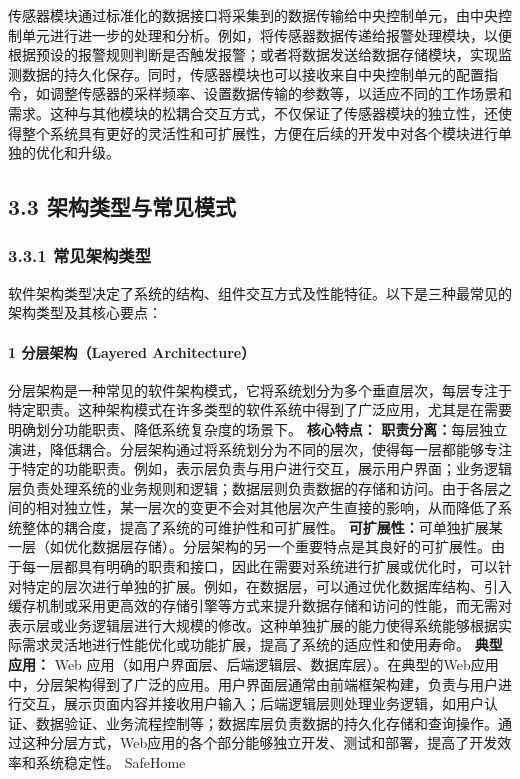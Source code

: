 传感器模块通过标准化的数据接口将采集到的数据传输给中央控制单元，由中央控制单元进行进一步的处理和分析。例如，将传感器数据传递给报警处理模块，以便根据预设的报警规则判断是否触发报警；或者将数据发送给数据存储模块，实现监测数据的持久化保存。同时，传感器模块也可以接收来自中央控制单元的配置指令，如调整传感器的采样频率、设置数据传输的参数等，以适应不同的工作场景和需求。这种与其他模块的松耦合交互方式，不仅保证了传感器模块的独立性，还使得整个系统具有更好的灵活性和可扩展性，方便在后续的开发中对各个模块进行单独的优化和升级。

\subsection{3.3 架构类型与常见模式}\label{ux67b6ux6784ux7c7bux578bux4e0eux5e38ux89c1ux6a21ux5f0f} \subsubsection{3.3.1 常见架构类型}\label{ux5e38ux89c1ux67b6ux6784ux7c7bux578b} 软件架构类型决定了系统的结构、组件交互方式及性能特征。以下是三种最常见的架构类型及其核心要点： \paragraph{1 分层架构（Layered Architecture）}\label{ux5206ux5c42ux67b6ux6784layered-architecture} 分层架构是一种常见的软件架构模式，它将系统划分为多个垂直层次，每层专注于特定职责。这种架构模式在许多类型的软件系统中得到了广泛应用，尤其是在需要明确划分功能职责、降低系统复杂度的场景下。 \textbf{核心特点：} \textbf{职责分离：}每层独立演进，降低耦合。分层架构通过将系统划分为不同的层次，使得每一层都能够专注于特定的功能职责。例如，表示层负责与用户进行交互，展示用户界面；业务逻辑层负责处理系统的业务规则和逻辑；数据层则负责数据的存储和访问。由于各层之间的相对独立性，某一层次的变更不会对其他层次产生直接的影响，从而降低了系统整体的耦合度，提高了系统的可维护性和可扩展性。 \textbf{可扩展性：}可单独扩展某一层（如优化数据层存储）。分层架构的另一个重要特点是其良好的可扩展性。由于每一层都具有明确的职责和接口，因此在需要对系统进行扩展或优化时，可以针对特定的层次进行单独的扩展。例如，在数据层，可以通过优化数据库结构、引入缓存机制或采用更高效的存储引擎等方式来提升数据存储和访问的性能，而无需对表示层或业务逻辑层进行大规模的修改。这种单独扩展的能力使得系统能够根据实际需求灵活地进行性能优化或功能扩展，提高了系统的适应性和使用寿命。 \textbf{典型应用：} Web 应用（如用户界面层、后端逻辑层、数据库层）。在典型的Web应用中，分层架构得到了广泛的应用。用户界面层通常由前端框架构建，负责与用户进行交互，展示页面内容并接收用户输入；后端逻辑层则处理业务逻辑，如用户认证、数据验证、业务流程控制等；数据库层负责数据的持久化存储和查询操作。通过这种分层方式，Web应用的各个部分能够独立开发、测试和部署，提高了开发效率和系统稳定性。 SafeHome 